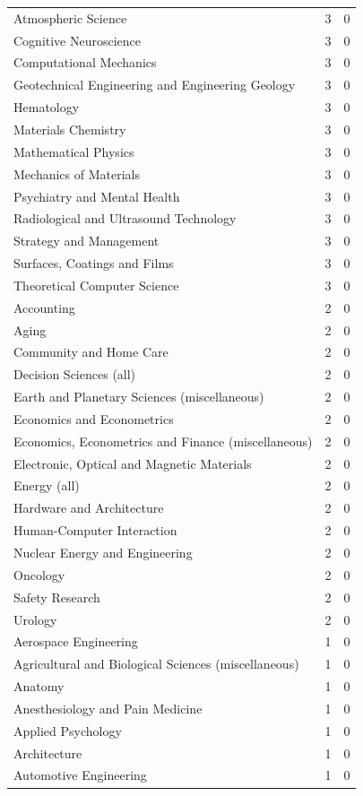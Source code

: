 \documentclass[12pt,brazil]{article}\usepackage[]{graphicx}\usepackage[]{xcolor}
\begin{document}
\begin{longtable}{lrr}
Atmospheric Science & 3 & 0 \\
Cognitive Neuroscience & 3 & 0 \\
Computational Mechanics & 3 & 0 \\
Geotechnical Engineering and Engineering Geology & 3 & 0 \\
Hematology & 3 & 0 \\
Materials Chemistry & 3 & 0 \\
Mathematical Physics & 3 & 0 \\
Mechanics of Materials & 3 & 0 \\
Psychiatry and Mental Health & 3 & 0 \\
Radiological and Ultrasound Technology & 3 & 0 \\
Strategy and Management & 3 & 0 \\
Surfaces, Coatings and Films & 3 & 0 \\
Theoretical Computer Science & 3 & 0 \\
Accounting & 2 & 0 \\
Aging & 2 & 0 \\
Community and Home Care & 2 & 0 \\
Decision Sciences (all) & 2 & 0 \\
Earth and Planetary Sciences (miscellaneous) & 2 & 0 \\
Economics and Econometrics & 2 & 0 \\
Economics, Econometrics and Finance (miscellaneous) & 2 & 0 \\
Electronic, Optical and Magnetic Materials & 2 & 0 \\
Energy (all) & 2 & 0 \\
Hardware and Architecture & 2 & 0 \\
Human-Computer Interaction & 2 & 0 \\
Nuclear Energy and Engineering & 2 & 0 \\
Oncology & 2 & 0 \\
Safety Research & 2 & 0 \\
Urology & 2 & 0 \\
Aerospace Engineering & 1 & 0 \\
Agricultural and Biological Sciences (miscellaneous) & 1 & 0 \\
Anatomy & 1 & 0 \\
Anesthesiology and Pain Medicine & 1 & 0 \\
Applied Psychology & 1 & 0 \\
Architecture & 1 & 0 \\
Automotive Engineering & 1 & 0 \\

\end{longtable}
\end{document}
